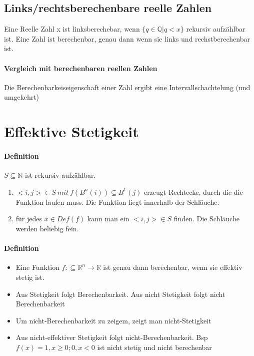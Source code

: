 \documentclass[ngerman]{scrartcl}
\begin{document}
\subsection{Links/rechtsberechenbare reelle Zahlen}
Eine Reelle Zahl x ist linksberechebar, wenn $ \{q \in \mathbb{Q} | q < x  \}  $ rekursiv aufzählbar ist.  Eine Zahl ist berechenbar, genau dann wenn sie links und rechstberechenbar ist.


\paragraph{Vergleich mit berechenbaren reellen Zahlen}
Die Berechenbarkeiseigenschaft einer Zahl ergibt eine Intervallschachtelung (und umgekehrt)


%
%
\section{Effektive Stetigkeit}

\paragraph{Definition}
$ S \subseteq \mathbb{N} $ ist rekursiv aufzählbar.
\begin{enumerate}
  \item $ <i,j> \in S\ mit\ f(B^n(i))\subseteq B^1(j) $ erzeugt Rechtecke, durch die die Funktion laufen muss. Die Funktion liegt innerhalb der Schläuche.
  \item für jedes $ x\in Def(f) $ kann man ein $ <i,j> \in S $ finden. Die Schläuche werden beliebig fein.
\end{enumerate}

\paragraph{Definition}
\begin{itemize}
  \item Eine Funktion $ f: \subseteq \mathbb{R}^n \rightarrow \mathbb{R} $ ist genau dann berechenbar, wenn sie effektiv stetig ist.
  \item Aus Stetigkeit folgt Berechenbarkeit. Aus nicht Stetigkeit folgt nicht Berechenbarkeit
  \item Um nicht-Berechenbarkeit zu zeigem, zeigt man nicht-Stetigkeit
  \item Aus nicht-effektiver Stetigkeit folgt nicht-Berechenbarkeit. Bsp $  f(x) = 1, x \geq 0; 0, x < 0 $ ist nicht stetig und nicht berechenbar
\end{itemize}
\end{document}
